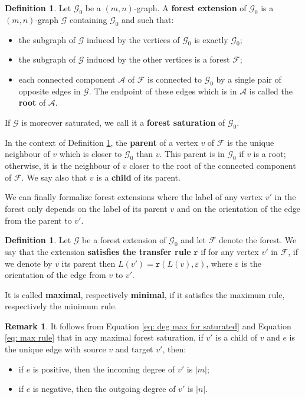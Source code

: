 \documentclass[12pt]{article}
\numberwithin{equation}{section}
\theoremstyle{definition}
\newtheorem{definition}[equation]{Definition}
\newtheorem{remark}[equation]{Remark}
\def\defin#1{\textbf{#1}}
\newcommand{\abs}[1]{\left\lvert #1\right\rvert}
\newcommand{\Fc}{\mathcal{F}}
\newcommand{\Gc}{\mathcal{G}}
\newcommand{\trrule}{\mathtt{r}}
\begin{document}
    \begin{definition}\label{def: forest saturation of a graph}
		Let \( \Gc_0 \) be a \( (m,n) \)-graph. A \defin{forest extension} of \( \Gc_0 \) 
		is a \( (m,n) \)-graph $\Gc$ containing $\Gc_0$ and such that:
		\begin{itemize}
			\item the subgraph of $\Gc$ induced by the vertices of $\Gc_0$ is exactly $\Gc_0$;
			\item the subgraph of $\Gc$ induced by the other vertices is a forest $\mathcal{F}$;
			\item each connected component $\mathcal A$ of $\mathcal{F}$ is connected to $\Gc_0$ by a single pair of opposite edges in $\Gc$. The endpoint of these edges which is in $\mathcal A$ is called the \defin{root} of $\mathcal A$. 
		\end{itemize}
		If $\Gc$ is moreover saturated, we call it a \defin{forest saturation} of $\Gc_0$.
	\end{definition}
	
	In the context of Definition \ref{def: forest saturation of a graph}, 
	the \defin{parent} of a vertex $v$ of $\Fc$ 
	is the unique neighbour of $v$ which is closer to $\Gc_0$ than $v$.
	This parent is in $\Gc_0$ if $v$ is a root;
	otherwise, it is the neighbour of $v$ closer to the root of the connected component of $\Fc$.
	We say also that $v$ is a \defin{child} of its parent.


	We can finally formalize forest extensions where 
	the label of any vertex \(v'\) in the forest only depends 
	on the label of its parent \(v\) and on the orientation of the edge from the parent to \(v'\).

	\begin{definition}
		Let $\Gc$ be a forest extension of $\Gc_0$ and let $\Fc$ denote the forest.
		We say that the extension \defin{satisfies the transfer rule} \( \trrule\) if
		for any vertex \(v'\) in \( \Fc \), if we denote by \(v\) its parent then 
		\(L(v') = \trrule(L(v),\varepsilon)\),
		where \(\varepsilon\) is the orientation of the edge from \(v\) to \(v'\).
		
		It is called \defin{maximal}, respectively \defin{minimal},
		if it satisfies the maximum rule, respectively the minimum rule.
	\end{definition}
    
    \begin{remark}\label{rmk: degree in max forest sat}
    It follows from Equation \eqref{eq: deg max for saturated} and Equation 
    \eqref{eq: max rule} that in any maximal forest saturation, if \(v'\)
    is a child of \(v\) and \(e\) is the unique edge with source \(v\) and target \(v'\),
    then:
    \begin{itemize}
        \item if \(e\) is positive, then the incoming degree of \(v'\) is \(\abs{m}\);
        \item if \(e\) is negative, then the outgoing degree of \(v'\) is \(\abs{n}\).
    \end{itemize}
    \end{remark}
    
\end{document}
